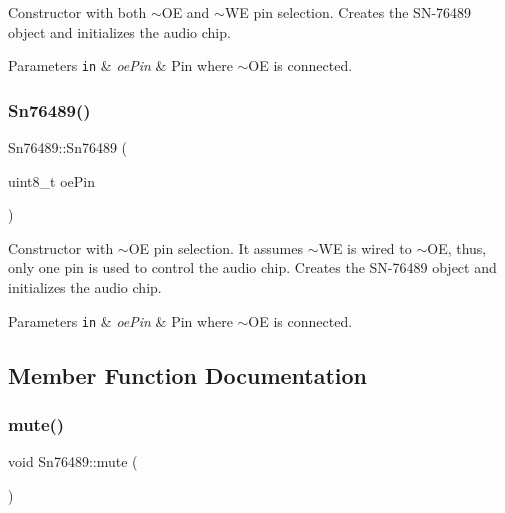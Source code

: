 Constructor with both $\sim$\+OE and $\sim$\+WE pin selection. Creates the S\+N-\/76489 object and initializes the audio chip.


\begin{DoxyParams}[1]{Parameters}
\mbox{\tt in}  & {\em oe\+Pin} & Pin where $\sim$\+OE is connected. \\
\hline
\end{DoxyParams}
\mbox{\label{classSn76489_aabb1ef1f5c22859a40def06b66dca93f}} 
\subsubsection{\texorpdfstring{Sn76489()}{Sn76489()}\hspace{0.1cm}{\footnotesize\ttfamily [2/2]}}
{\footnotesize\ttfamily Sn76489\+::\+Sn76489 (\begin{DoxyParamCaption}\item[{uint8\+\_\+t}]{oe\+Pin }\end{DoxyParamCaption})\hspace{0.3cm}{\ttfamily [inline]}}

Constructor with $\sim$\+OE pin selection. It assumes $\sim$\+WE is wired to $\sim$\+OE, thus, only one pin is used to control the audio chip. Creates the S\+N-\/76489 object and initializes the audio chip.


\begin{DoxyParams}[1]{Parameters}
\mbox{\tt in}  & {\em oe\+Pin} & Pin where $\sim$\+OE is connected. \\
\hline
\end{DoxyParams}


\subsection{Member Function Documentation}
\mbox{\label{classSn76489_af292b88ad1659a1fd58a51bddb0cc1dc}} 
\subsubsection{\texorpdfstring{mute()}{mute()}}
{\footnotesize\ttfamily void Sn76489\+::mute (\begin{DoxyParamCaption}{ }\end{DoxyParamCaption})}

